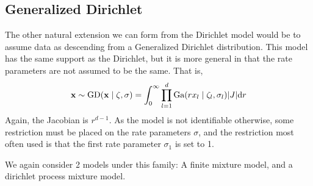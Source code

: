\subsection{Generalized Dirichlet}
The other natural extension we can form from the Dirichlet model would be to assume data as
  descending from a Generalized Dirichlet distribution.  This model has the same support as the
  Dirichlet, but it is more general in that the rate parameters are not assumed to be the same.
  That is,
  \begin{equation}
    \label{eq:gendirichletrv}
    {\bf x} \sim \text{GD}({\bf x}\mid \zeta, \sigma) =
        \int_0^{\infty}\prod_{l = 1}^d\text{Ga}(rx_l\mid \zeta_l, \sigma_l)\lvert J\rvert\text{d}r
  \end{equation}
Again, the Jacobian is $r^{d-1}$.  As the model is not identifiable otherwise, some restriction
  must be placed on the rate parameters $\sigma$, and the restriction most often used is that the
  first rate parameter $\sigma_1$ is set to 1.

We again consider 2 models under this family: A finite mixture model, and a dirichlet process
  mixture model.

